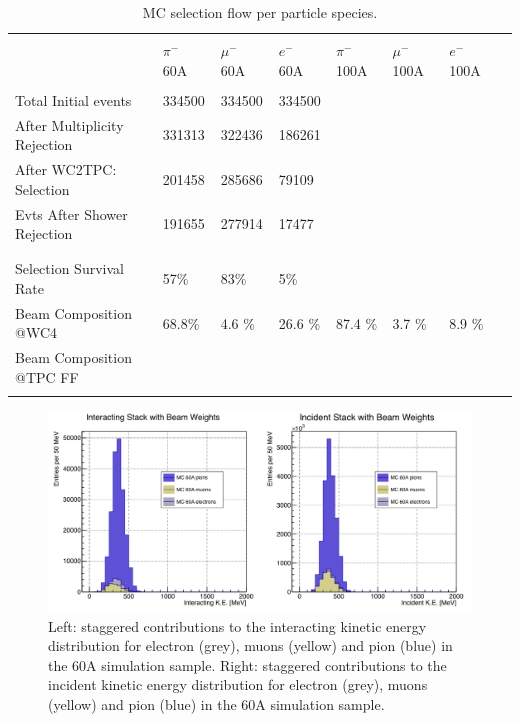 \begin{table}[p]
\centering
\begin{tabular}{| l | l | l | l | l | l | l | l | }
\hline
                                                  &                      &                       &                   &                       &                        &\\  
                                                  & $\pi^-$  60A  & $ \mu^-$ 60A & $e^-$  60A & $\pi^-$ 100A  & $\mu^-$ 100A & $e^-$  100A  \\
\hline
&  &  &  & & &\\  
Total Initial events                     & 334500  & 334500  & 334500 & & & \\
After Multiplicity Rejection        & 331313   & 322436  &  186261& & &\\
After WC2TPC: Selection         & 201458  & 285686 & 79109 & & &\\
Evts After Shower Rejection     & 191655  &  277914 &   17477 & & &\\
&  &  &  & & &\\  
  \hline
&  &  &  & & &\\  
Selection Survival Rate           &57\% & 83\% & 5\% & & &\\
Beam Composition  @WC4      &  68.8\%   &  4.6 \%  & 26.6 \%    & 87.4 \% & 3.7 \%  & 8.9 \% \\ %
Beam Composition   @TPC FF &     &   &     & & &\\
         &                               &             &                      &  \\ 
\hline
\end{tabular}
\caption{MC selection flow per particle species.}
\label{tab:MCafterCutContaminants}
\end{table}


\begin{figure}[p]
\centering
\includegraphics[width=\textwidth]{Studies/Figures/Staggered60A.png}
\caption{Left: staggered contributions to the interacting kinetic energy distribution for electron (grey), muons (yellow) and pion (blue) in the 60A simulation sample. Right: staggered contributions to the incident kinetic energy distribution for electron (grey), muons (yellow) and pion (blue) in the 60A simulation sample.  }
\label{fig:stag60A}
\end{figure}

